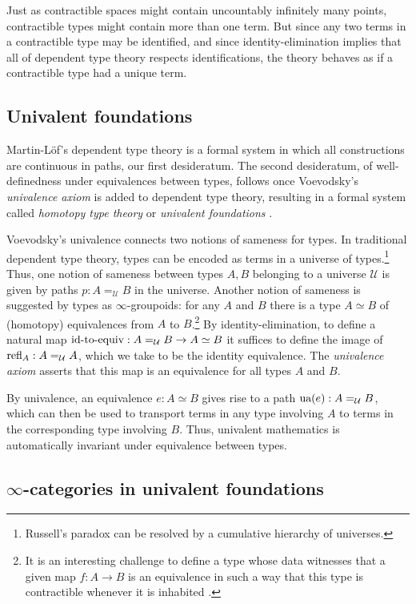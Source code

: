 \documentclass[11pt]{ctexart}
\theoremstyle{definition}
\theoremstyle{remark}
\numberwithin{equation}{section}
\newcommand{\refl}{\textup{refl}}
\newcommand{\ua}{\textup{ua}}
\newcommand{\cU}{\mathcal{U}}
\newcommand{\1}{\mathbbe{1}}
\newcommand{\2}{\mathbbe{2}}
\newcommand{\3}{\mathbbe{3}}
\begin{document}
Just as contractible spaces might contain uncountably infinitely many points, contractible types might contain more than one term. But since any two terms in a contractible type may be identified, and since identity-elimination implies that all of dependent type theory respects identifications, the theory behaves as if a contractible type had a unique term.

\subsection*{Univalent foundations}

Martin-L\"{o}f's dependent type theory is a formal system in which all constructions are continuous in paths, our first desideratum. The second desideratum, of well-definedness under equivalences between types, follows once Voevodsky's \emph{univalence axiom} is added to dependent type theory, resulting in a formal system called \emph{homotopy type theory}  or \emph{univalent foundations} \cite{rijke, HoTT}.

Voevodsky's univalence connects two notions of sameness for types. In traditional dependent type theory, types can be encoded as terms in a universe of types.\footnote{Russell's paradox can be resolved by a cumulative hierarchy of universes.} Thus, one notion of sameness between types $A, B$ belonging to a universe $\cU$ is given by paths $p : A=_\cU B$ in the universe. Another notion of sameness is suggested by types as $\infty$-groupoids: for any $A$ and $B$ there is a type $A \simeq B$ of (homotopy) equivalences from $A$ to $B$.\footnote{It is an interesting challenge to define a type whose data witnesses that a given map $f \colon A \to B$ is an equivalence in such a way that this type is contractible whenever it is inhabited \cite[\S4]{HoTT}.}
 By identity-elimination, to define a natural map $\textup{id-to-equiv}: A =_\cU B \to A \simeq B$ it suffices to define the image of $\refl_A : A =_\cU A$, which we take to be the identity equivalence. The \emph{univalence axiom} asserts that this map is an equivalence for all types $A$ and $B$.

By univalence, an equivalence $e : A \simeq B$ gives rise to a path $\ua(e) : A =_\cU B$, which can then be used to transport terms in any type involving $A$ to terms in the corresponding type involving $B$. Thus, univalent mathematics is automatically invariant under equivalence between types.

\subsection*{\texorpdfstring{$\infty$}{Infinity}-categories in univalent foundations}
\end{document}
